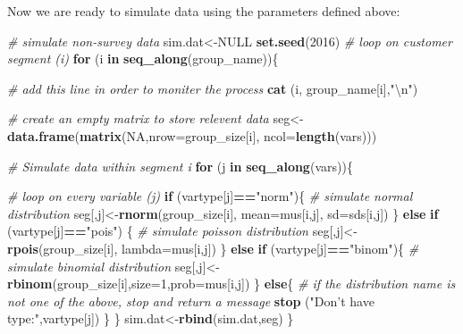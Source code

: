 \documentclass[12pt,]{krantz}
\makeatletter
\newenvironment{Shaded}{\begin{snugshade}}{\end{snugshade}}
\newcommand{\CharTok}[1]{\textcolor[rgb]{0.5,0.5,0.5}{#1}}
\newcommand{\CommentTok}[1]{\textcolor[rgb]{0.37,0.37,0.37}{\textit{#1}}}
\newcommand{\ControlFlowTok}[1]{\textcolor[rgb]{0.27,0.27,0.27}{\textbf{#1}}}
\newcommand{\DataTypeTok}[1]{\textcolor[rgb]{0.27,0.27,0.27}{#1}}
\newcommand{\DecValTok}[1]{\textcolor[rgb]{0.06,0.06,0.06}{#1}}
\newcommand{\KeywordTok}[1]{\textcolor[rgb]{0.27,0.27,0.27}{\textbf{#1}}}
\newcommand{\NormalTok}[1]{#1}
\newcommand{\OperatorTok}[1]{\textcolor[rgb]{0.43,0.43,0.43}{\textbf{#1}}}
\newcommand{\OtherTok}[1]{\textcolor[rgb]{0.37,0.37,0.37}{#1}}
\newcommand{\StringTok}[1]{\textcolor[rgb]{0.5,0.5,0.5}{#1}}
\newenvironment{kframe}{%
\medskip{}
\setlength{\fboxsep}{.8em}
 \def\at@end@of@kframe{}%
 \ifinner\ifhmode%
  \def\at@end@of@kframe{\end{minipage}}%
  \begin{minipage}{\columnwidth}%
 \fi\fi%
 \def\FrameCommand##1{\hskip\@totalleftmargin \hskip-\fboxsep
 \colorbox{shadecolor}{##1}\hskip-\fboxsep
     \hskip-\linewidth \hskip-\@totalleftmargin \hskip\columnwidth}%
 \MakeFramed {\advance\hsize-\width
   \@totalleftmargin\z@ \linewidth\hsize
   \@setminipage}}%
 {\par\unskip\endMakeFramed%
 \at@end@of@kframe}
\renewenvironment{Shaded}{\begin{kframe}}{\end{kframe}}
\makeatother
\begin{document}
Now we are ready to simulate data using the parameters defined above:

\begin{Shaded}
\begin{Highlighting}[]
\CommentTok{# simulate non-survey data}
\NormalTok{sim.dat<-}\OtherTok{NULL}
\KeywordTok{set.seed}\NormalTok{(}\DecValTok{2016}\NormalTok{)}
\CommentTok{# loop on customer segment (i)}
 \ControlFlowTok{for}\NormalTok{ (i }\ControlFlowTok{in} \KeywordTok{seq_along}\NormalTok{(group_name))\{}
 
   \CommentTok{# add this line in order to moniter the process}
   \KeywordTok{cat}\NormalTok{ (i, group_name[i],}\StringTok{"}\CharTok{\textbackslash{}n}\StringTok{"}\NormalTok{)}
 
  \CommentTok{# create an empty matrix to store relevent data}
\NormalTok{  seg<-}\KeywordTok{data.frame}\NormalTok{(}\KeywordTok{matrix}\NormalTok{(}\OtherTok{NA}\NormalTok{,}\DataTypeTok{nrow=}\NormalTok{group_size[i], }\DataTypeTok{ncol=}\KeywordTok{length}\NormalTok{(vars)))  }
 
  \CommentTok{# Simulate data within segment i}
  \ControlFlowTok{for}\NormalTok{ (j }\ControlFlowTok{in} \KeywordTok{seq_along}\NormalTok{(vars))\{}
 
    \CommentTok{# loop on every variable (j)}
    \ControlFlowTok{if}\NormalTok{ (vartype[j]}\OperatorTok{==}\StringTok{"norm"}\NormalTok{)\{}
      \CommentTok{# simulate normal distribution}
\NormalTok{      seg[,j]<-}\KeywordTok{rnorm}\NormalTok{(group_size[i], }\DataTypeTok{mean=}\NormalTok{mus[i,j], }\DataTypeTok{sd=}\NormalTok{sds[i,j])}
\NormalTok{    \} }\ControlFlowTok{else} \ControlFlowTok{if}\NormalTok{ (vartype[j]}\OperatorTok{==}\StringTok{"pois"}\NormalTok{) \{}
      \CommentTok{# simulate poisson distribution}
\NormalTok{      seg[,j]<-}\KeywordTok{rpois}\NormalTok{(group_size[i], }\DataTypeTok{lambda=}\NormalTok{mus[i,j])}
\NormalTok{    \} }\ControlFlowTok{else} \ControlFlowTok{if}\NormalTok{ (vartype[j]}\OperatorTok{==}\StringTok{"binom"}\NormalTok{)\{}
      \CommentTok{# simulate binomial distribution}
\NormalTok{      seg[,j]<-}\KeywordTok{rbinom}\NormalTok{(group_size[i],}\DataTypeTok{size=}\DecValTok{1}\NormalTok{,}\DataTypeTok{prob=}\NormalTok{mus[i,j])}
\NormalTok{    \} }\ControlFlowTok{else}\NormalTok{\{}
      \CommentTok{# if the distribution name is not one of the above, stop and return a message}
      \KeywordTok{stop}\NormalTok{ (}\StringTok{"Don't have type:"}\NormalTok{,vartype[j])}
\NormalTok{    \}        }
\NormalTok{  \}}
\NormalTok{  sim.dat<-}\KeywordTok{rbind}\NormalTok{(sim.dat,seg)}
\NormalTok{ \}}
\end{Highlighting}
\end{Shaded}
\end{document}
